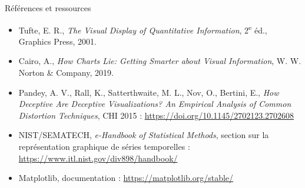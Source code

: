 \documentclass[aspectratio=169]{beamer}
\begin{document}
\begin{frame}{Références et ressources}
  \tiny
  \begin{itemize}
    \item Tufte, E. R., \emph{The Visual Display of Quantitative Information}, 2\textsuperscript{e} éd., Graphics Press, 2001.
    \item Cairo, A., \emph{How Charts Lie: Getting Smarter about Visual Information}, W. W. Norton \& Company, 2019.
    \item Pandey, A. V., Rall, K., Satterthwaite, M. L., Nov, O., Bertini, E., \emph{How Deceptive Are Deceptive Visualizations? An Empirical Analysis of Common Distortion Techniques}, CHI 2015 : \url{https://doi.org/10.1145/2702123.2702608}
    \item NIST/SEMATECH, \emph{e-Handbook of Statistical Methods}, section sur la représentation graphique de séries temporelles : \url{https://www.itl.nist.gov/div898/handbook/}
    \item Matplotlib, documentation : \url{https://matplotlib.org/stable/}
  \end{itemize}
\end{frame}
\end{document}
